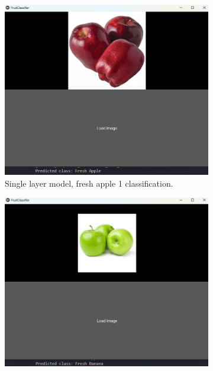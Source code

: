 \documentclass[conference]{IEEEtran}
\begin{document}
\begin{figure}[h]
    \centering
    \begin{subfigure}[b]{0.48\linewidth}
        \centering
        \includegraphics[width=\linewidth]{1layer appel1.png}
        \caption{Single layer model, fresh apple 1 classification.}
        \label{figFA}
    \end{subfigure}
    \hfill
    \begin{subfigure}[b]{0.48\linewidth}
        \centering
        \includegraphics[width=\linewidth]{1layer appel2.png}

\end{subfigure}
\end{figure}
\end{document}

